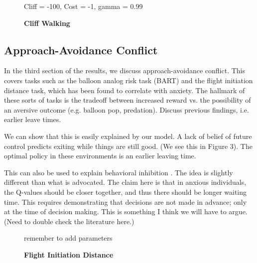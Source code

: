 \documentclass[11pt]{article} %
\begin{document}
\begin{figure}
  \centerline{%
  }
  \caption{\textbf{Cliff Walking}}
  \par Cliff = -100, Cost = -1, gamma = 0.99
\end{figure}

\subsection{Approach-Avoidance Conflict}

In the third section of the results, we discuss approach-avoidance conflict.
This covers tasks such as the balloon analog risk task (BART) and the flight
initiation distance task, which has been found to correlate with anxiety. The
hallmark of these sorts of tasks is the tradeoff between increased reward vs.
the possibility of an aversive outcome (e.g. balloon pop, predation). Discuss
previous findings, i.e. earlier leave times.

We can show that this is easily explained by our model. A lack of belief of
future control predicts exiting while things are still good. (We see this in
Figure 3). The optimal policy in these environments is an earlier leaving time.

This can also be used to explain behavioral inhibition \citep{bach2015, khemka2017}.
The idea is slightly different than what is advocated. The claim here is that
in anxious individuals, the Q-values should be closer together, and thus there
should be longer waiting time. This requires demonstrating that decisions are
not made in advance; only at the time of decision making. This is something
I think we will have to argue. (Need to double check the literature here.)

\begin{figure}
  \centerline{%
  }
  \caption{\textbf{Flight Initiation Distance}}
  \par remember to add parameters
\end{figure}
\end{document}
